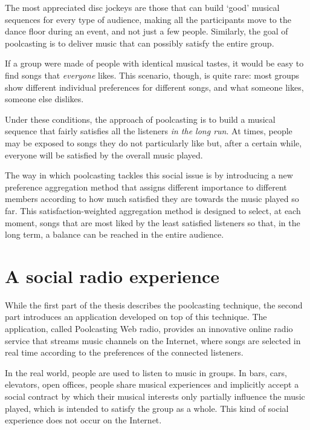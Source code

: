 The most appreciated disc jockeys are those that can build `good' musical sequences for every type of audience, making all the participants move to the dance floor during an event, and not just a few people.
Similarly, the goal of poolcasting is to deliver music that can possibly satisfy the entire group. %

If a group were made of people with identical musical tastes, it would be easy to find songs that \emph{everyone} likes. This scenario, though, is quite rare: most groups show different individual preferences for different songs, and what someone likes, someone else dislikes.

Under these conditions, the approach of poolcasting is to build a musical sequence that fairly satisfies all the listeners \emph{in the long run}. 
At times, people may be exposed to songs they do not particularly like but, after a certain while, everyone will be satisfied by the overall music played.

The way in which poolcasting tackles this social issue is by introducing a new preference aggregation method that assigns different importance to different members according to how much satisfied they are towards the music played so far. 
This satisfaction-weighted aggregation method is designed to select, at each moment, songs that are most liked by the least satisfied listeners so that, in the long term, a balance can be reached in the entire audience.

\section{A social radio experience} %
\label{sec:a_social_radio_experience}

While the first part of the thesis describes the poolcasting technique, the second part introduces an application developed on top of this technique. %
The application, called Poolcasting Web radio, provides an innovative online radio service that streams music channels on the Internet, where songs are selected in real time according to the preferences of the connected listeners.

In the real world, people are used to listen to music in groups.
In bars, cars, elevators, open offices, people share musical experiences and implicitly accept a social contract by which their musical interests only partially influence the music played, which is intended to satisfy the group as a whole.
This kind of social experience does not occur on the Internet.

